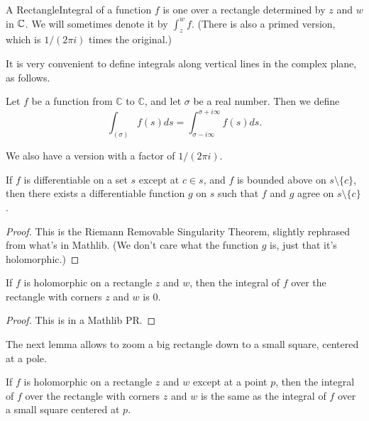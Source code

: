 
\begin{definition}[RectangleIntegral]\label{RectangleIntegral}\leanok
A RectangleIntegral of a function $f$ is one over a rectangle determined by $z$ and $w$ in $\C$.
We will sometimes denote it by $\int_{z}^{w} f$. (There is also a primed version, which is $1/(2\pi i)$ times the original.)
\end{definition}


It is very convenient to define integrals along vertical lines in the complex plane, as follows.
\begin{definition}[VerticalIntegral]\label{VerticalIntegral}\leanok
Let $f$ be a function from $\mathbb{C}$ to $\mathbb{C}$, and let $\sigma$ be a real number. Then we define
$$\int_{(\sigma)}f(s)ds = \int_{\sigma-i\infty}^{\sigma+i\infty}f(s)ds.$$
\end{definition}

 We also have a version with a factor of $1/(2\pi i)$.


\begin{theorem}\label{existsDifferentiableOn_of_bddAbove}\leanok
If $f$ is differentiable on a set $s$ except at $c\in s$, and $f$ is bounded above on $s\setminus\{c\}$, then there exists a differentiable function $g$ on $s$ such that $f$ and $g$ agree on $s\setminus\{c\}$.
\end{theorem}


\begin{proof}\leanok
This is the Riemann Removable Singularity Theorem, slightly rephrased from what's in Mathlib. (We don't care what the function $g$ is, just that it's holomorphic.)
\end{proof}


\begin{theorem}\label{HolomorphicOn.vanishesOnRectangle}\leanok
If $f$ is holomorphic on a rectangle $z$ and $w$, then the integral of $f$ over the rectangle with corners $z$ and $w$ is $0$.
\end{theorem}


\begin{proof}\leanok
This is in a Mathlib PR.
\end{proof}


The next lemma allows to zoom a big rectangle down to a small square, centered at a pole.

\begin{lemma}[RectanglePullToNhdOfPole]\label{RectanglePullToNhdOfPole}\leanok
If $f$ is holomorphic on a rectangle $z$ and $w$ except at a point $p$, then the integral of $f$
over the rectangle with corners $z$ and $w$ is the same as the integral of $f$ over a small square
centered at $p$.
\end{lemma}



